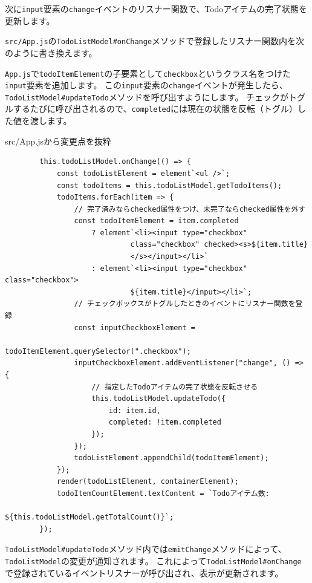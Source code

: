 次に\texttt{input}要素の\texttt{change}イベントのリスナー関数で、Todoアイテムの完了状態を更新します。

\texttt{src/App.js}の\texttt{TodoListModel\#onChange}メソッドで登録したリスナー関数内を次のように書き換えます。

\texttt{App.js}で\texttt{todoItemElement}の子要素として\texttt{checkbox}というクラス名をつけた\texttt{input}要素を追加します。
この\texttt{input}要素の\texttt{change}イベントが発生したら、\texttt{TodoListModel\#updateTodo}メソッドを呼び出すようにします。
チェックがトグルするたびに呼び出されるので、\texttt{completed}には現在の状態を反転（トグル）した値を渡します。

\begin{listtitle}
src/App.jsから変更点を抜粋
\end{listtitle}
\begin{lstlisting}
        this.todoListModel.onChange(() => {
            const todoListElement = element`<ul />`;
            const todoItems = this.todoListModel.getTodoItems();
            todoItems.forEach(item => {
                // 完了済みならchecked属性をつけ、未完了ならchecked属性を外す
                const todoItemElement = item.completed
                    ? element`<li><input type="checkbox" 
                             class="checkbox" checked><s>${item.title}
                             </s></input></li>`
                    : element`<li><input type="checkbox" class="checkbox">
                             ${item.title}</input></li>`;
                // チェックボックスがトグルしたときのイベントにリスナー関数を登録
                const inputCheckboxElement = 
                                  todoItemElement.querySelector(".checkbox");
                inputCheckboxElement.addEventListener("change", () => {
                    // 指定したTodoアイテムの完了状態を反転させる
                    this.todoListModel.updateTodo({
                        id: item.id,
                        completed: !item.completed
                    });
                });
                todoListElement.appendChild(todoItemElement);
            });
            render(todoListElement, containerElement);
            todoItemCountElement.textContent = `Todoアイテム数: 
                                      ${this.todoListModel.getTotalCount()}`;
        });
\end{lstlisting}
\listend

\texttt{TodoListModel\#updateTodo}メソッド内では\texttt{emitChange}メソッドによって、\texttt{TodoListModel}の変更が通知されます。
これによって\texttt{TodoListModel\#onChange}で登録されているイベントリスナーが呼び出され、表示が更新されます。

